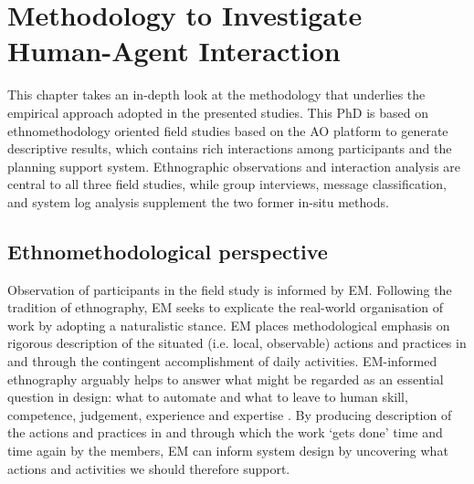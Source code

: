 




\chapter{Methodology to Investigate Human-Agent Interaction}\label{ch:methodology}
This chapter takes an in-depth look at the methodology that underlies the empirical approach adopted in the presented studies. This PhD is based on ethnomethodology oriented field studies based on the \acf{AO} platform to generate descriptive results, which contains rich interactions among participants and the planning support system. Ethnographic observations and interaction analysis are central to all three field studies, while group interviews, message classification, and system log analysis supplement the two former in-situ methods.\\

\section{Ethnomethodological perspective}
Observation of participants in the field study is informed by \acf{EM}. Following the tradition of ethnography, \ac{EM} seeks to explicate the real-world organisation of work by adopting a naturalistic stance. \ac{EM} places methodological emphasis on rigorous description of the situated (i.e. local, observable) actions and practices \citep{Suchman1987} in and through the contingent accomplishment of daily activities. \ac{EM}-informed ethnography arguably helps to answer what might be regarded as an essential question in design: what to automate and what to leave to human skill, competence, judgement, experience and expertise \citep{Crabtree2012}. By producing description of the actions and practices in and through which the work `gets done' time and time again by the members, \ac{EM} can inform system design by uncovering what actions and activities we should therefore support.\\

